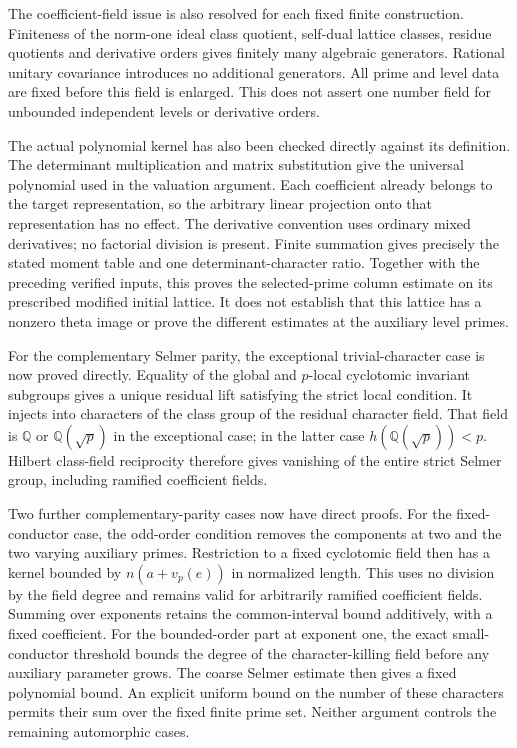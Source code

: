 \documentclass[11pt,a4paper]{article}
\theoremstyle{remark}
\begin{document}
The coefficient-field issue is also resolved for each fixed finite
construction. Finiteness of the norm-one ideal class quotient,
self-dual lattice classes, residue quotients and derivative orders
gives finitely many algebraic generators. Rational unitary covariance
introduces no additional generators. All prime and level data are
fixed before this field is enlarged. This does not assert one number
field for unbounded independent levels or derivative orders.

The actual polynomial kernel has also been checked directly against
its definition. The determinant multiplication and matrix substitution
give the universal polynomial used in the valuation argument.
Each coefficient already belongs to the target representation, so
the arbitrary linear projection onto that representation has no
effect. The derivative convention uses ordinary mixed derivatives;
no factorial division is present. Finite summation gives precisely
the stated moment table and one determinant-character ratio.
Together with the preceding verified inputs, this proves the
selected-prime column estimate on its prescribed modified initial
lattice. It does not establish that this lattice has a nonzero theta
image or prove the different estimates at the auxiliary level primes.

For the complementary Selmer parity, the exceptional trivial-character
case is now proved directly. Equality of the global and $p$-local
cyclotomic invariant subgroups gives a unique residual lift satisfying
the strict local condition. It injects into characters of the class
group of the residual character field. That field is $\mathbb Q$ or
$\mathbb Q(\sqrt p)$ in the exceptional case; in the latter case
$h(\mathbb Q(\sqrt p))<p$. Hilbert class-field reciprocity therefore
gives vanishing of the entire strict Selmer group, including ramified
coefficient fields\cite{milne-cft}.

Two further complementary-parity cases now have direct proofs.
For the fixed-conductor case, the odd-order condition removes the
components at two and the two varying auxiliary primes. Restriction
to a fixed cyclotomic field then has a kernel bounded by
$n(a+v_p(e))$ in normalized length. This uses no division by the
field degree and remains valid for arbitrarily ramified coefficient
fields. Summing over exponents retains the common-interval bound
additively, with a fixed coefficient. For the bounded-order part at
exponent one, the exact small-conductor threshold bounds the degree
of the character-killing field before any auxiliary parameter grows.
The coarse Selmer estimate then gives a fixed polynomial bound.
An explicit uniform bound on the number of these characters permits
their sum over the fixed finite prime set. Neither argument controls
the remaining automorphic cases.
\end{document}
